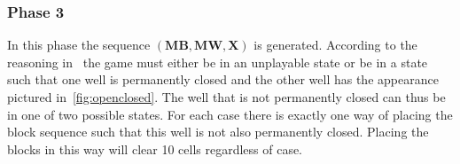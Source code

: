 \subsubsection{Phase 3}

In this phase the sequence $\left( \mathbf{MB}, \mathbf{MW}, \mathbf{X} \right)$ is generated. According to the reasoning in~ the game must either be in an unplayable state or be in a state such that one well is permanently closed and the other well has the appearance pictured in~\autoref{fig:openclosed}. The well that is not permanently closed can thus be in one of two possible states. For each case there is exactly one way of placing the block sequence such that this well is not also permanently closed. Placing the blocks in this way will clear 10 cells regardless of case.

